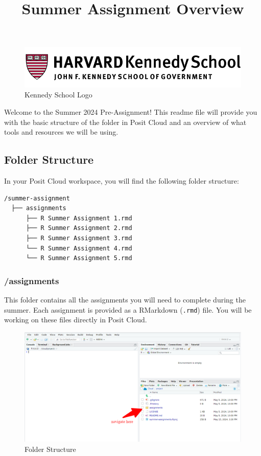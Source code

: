 \documentclass[
]{article}
\title{Summer Assignment Overview}
\author{}
\date{\vspace{-2.5em}}
\begin{document}
\maketitle

\begin{figure}
\centering
\includegraphics{figs/logo.png}
\caption{Kennedy School Logo}
\end{figure}

Welcome to the Summer 2024 Pre-Assignment! This readme file will provide
you with the basic structure of the folder in Posit Cloud and an
overview of what tools and resources we will be using.

\subsection{Folder Structure}\label{folder-structure}

In your Posit Cloud workspace, you will find the following folder
structure:

\begin{verbatim}
/summer-assignment
  ├── assignments
      ├── R Summer Assignment 1.rmd
      ├── R Summer Assignment 2.rmd
      ├── R Summer Assignment 3.rmd
      └── R Summer Assignment 4.rmd
      └── R Summer Assignment 5.rmd
\end{verbatim}

\subsubsection{/assignments}\label{assignments}

This folder contains all the assignments you will need to complete
during the summer. Each assignment is provided as a RMarkdown
(\texttt{.rmd}) file. You will be working on these files directly in
Posit Cloud.

\begin{figure}
\centering
\includegraphics{figs/folder_structure.png}
\caption{Folder Structure}
\end{figure}
\end{document}
